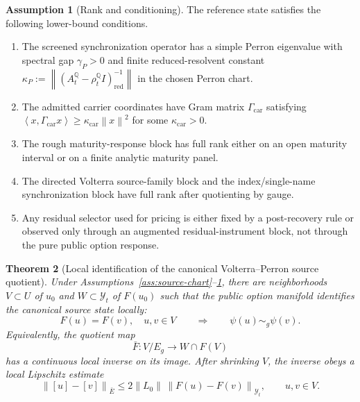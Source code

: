 \documentclass[11pt,a4paper]{amsart}
\theoremstyle{plain}
\newtheorem{theorem}{Theorem}[section]
\theoremstyle{definition}
\newtheorem{assumption}[theorem]{Assumption}
\theoremstyle{remark}
\newcommand{\QQ}{\mathbb{Q}}
\newcommand{\cY}{\mathcal{Y}}
\newcommand{\norm}[1]{\left\lVert #1\right\rVert}
\newcommand{\ip}[2]{\left\langle #1,#2\right\rangle}
\begin{document}
\begin{assumption}[Rank and conditioning]\label{ass:structural-nondegeneracy}
The reference state satisfies the following lower-bound conditions.
\begin{enumerate}[leftmargin=2em]
\item The screened synchronization operator has a simple Perron eigenvalue with spectral gap
\(\gamma_P>0\) and finite reduced-resolvent constant
\(\kappa_P:=\norm{(A_t^\QQ-\rho_t^\QQ I)_{\mathrm{red}}^{-1}}\) in the chosen Perron chart.
\item The admitted carrier coordinates have Gram matrix \(\Gamma_{\mathrm{car}}\) satisfying
\(\ip{x}{\Gamma_{\mathrm{car}}x}\ge\kappa_{\mathrm{car}}\norm{x}^2\) for some
\(\kappa_{\mathrm{car}}>0\).
\item The rough maturity-response block has full rank either on an open maturity interval or on a
finite analytic maturity panel.
\item The directed Volterra source-family block and the index/single-name synchronization block
have full rank after quotienting by gauge.
\item Any residual selector used for pricing is either fixed by a post-recovery rule or observed
only through an augmented residual-instrument block, not through the pure public option response.
\end{enumerate}
\end{assumption}

\begin{theorem}[Local identification of the canonical Volterra--Perron source quotient]\label{thm:conditional-recovery}
Under Assumptions~\ref{ass:source-chart}--\ref{ass:structural-nondegeneracy}, there are
neighborhoods \(V\subset U\) of \(u_0\) and \(W\subset \cY_t\) of \(F(u_0)\) such that the public
option manifold identifies the canonical source state locally:
\[
        F(u)=F(v),\quad u,v\in V
        \qquad\Longrightarrow\qquad
        \psi(u)\sim_g\psi(v).
\]
Equivalently, the quotient map
\[
        \bar F:V/E_g\to W\cap F(V)
\]
has a continuous local inverse on its image.  After shrinking \(V\), the inverse obeys
a local Lipschitz estimate
\[
        \norm{[u]-[v]}_{\bar E}
        \le
        2\norm{L_0}\,\norm{F(u)-F(v)}_{\cY_t},
        \qquad u,v\in V.
\]
\end{theorem}
\end{document}
